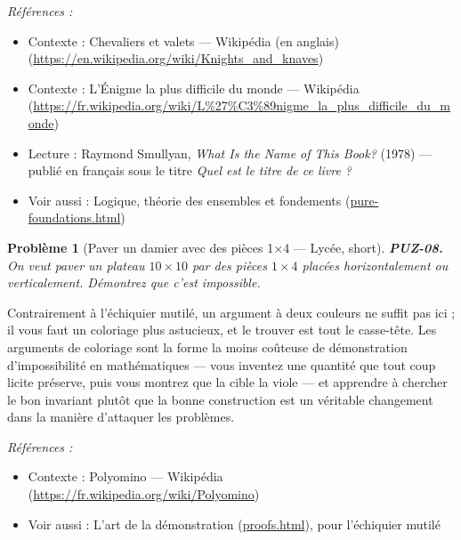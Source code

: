 \documentclass[11pt]{article}
\newtheorem{problem}{Problème}
\newenvironment{refs}{\par\small\noindent\emph{Références :}\begin{itemize}\setlength\itemsep{0pt}}{\end{itemize}\normalsize}
\begin{document}
\begin{refs}
\item Contexte : Chevaliers et valets --- Wikipédia (en anglais) (\url{https://en.wikipedia.org/wiki/Knights_and_knaves})
\item Contexte : L'Énigme la plus difficile du monde --- Wikipédia (\url{https://fr.wikipedia.org/wiki/L%27%C3%89nigme_la_plus_difficile_du_monde})
\item Lecture : Raymond Smullyan, \textit{What Is the Name of This Book?} (1978) --- publié en français sous le titre \textit{Quel est le titre de ce livre ?}
\item Voir aussi : Logique, théorie des ensembles et fondements (\url{pure-foundations.html})
\end{refs}

\bigskip

\begin{problem}[{Paver un damier avec des pièces 1$\times$4 --- Lycée, short}]
\textbf{PUZ-08.} On veut paver un plateau $ 10 \times 10 $ par des
pièces $ 1 \times 4 $ placées horizontalement ou verticalement. Démontrez que c'est
impossible.
\end{problem}

\noindent Contrairement à l'échiquier mutilé, un argument à deux couleurs ne suffit
pas ici ; il vous faut un coloriage plus astucieux, et le trouver est tout le casse-tête.
Les arguments de coloriage sont la forme la moins coûteuse de démonstration d'impossibilité
en mathématiques --- vous inventez une quantité que tout coup licite préserve, puis vous
montrez que la cible la viole --- et apprendre à chercher le bon invariant plutôt que la
bonne construction est un véritable changement dans la manière d'attaquer les
problèmes.

\begin{refs}
\item Contexte : Polyomino --- Wikipédia (\url{https://fr.wikipedia.org/wiki/Polyomino})
\item Voir aussi : L'art de la démonstration (\url{proofs.html}), pour l'échiquier mutilé
\end{refs}

\bigskip
\end{document}
